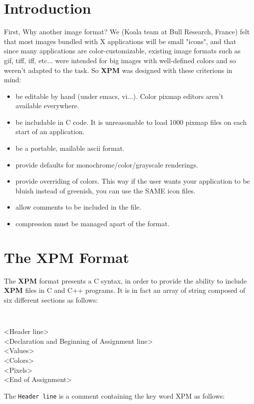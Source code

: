 \newpage
\section{Introduction}
First, Why another image format?  We (Koala team at Bull Research, France)
felt that most images bundled with X applications will be small "icons", and
that since many applications are color-customizable, existing image formats
such as gif, tiff, iff, etc... were intended for big images with well-defined
colors and so weren't adapted to the task.  So {\bf XPM} was designed with
these criterions in mind:
\begin{itemize}
\item be editable by hand (under emacs, vi...). Color pixmap editors aren't
available everywhere.
\item be includable in C code. It is unreasonable to load
1000 pixmap files on each start of an application.
\item be a portable, mailable ascii format.
\item provide defaults for monochrome/color/grayscale renderings.
\item provide overriding of colors. This way if the user wants your application
to be bluish instead of greenish, you can use the SAME icon files.
\item allow comments to be included in the file.
\item compression must be managed apart of the format.
\end{itemize}

\newpage
\section{The {\bf XPM} Format}

The {\bf XPM} format presents a C syntax, in order to provide the ability to
include {\bf XPM} files in C and C++ programs.  It is in fact an array of
string composed of six different sections as follows:
{\tt
\begin{flushleft}
\hspace{1cm}<Header line>\\
\hspace{1cm}<Declaration and Beginning of Assignment line>\\
\hspace{1cm}<Values>\\
\hspace{1cm}<Colors>\\
\hspace{1cm}<Pixels>\\
\hspace{1cm}<End of Assignment>
\end{flushleft}
}
The {\tt Header line} is a comment containing the key word XPM as follows: 

